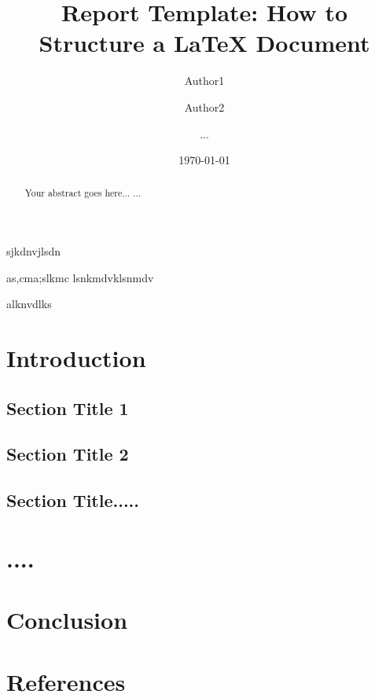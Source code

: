 \documentclass[11pt,a4paper]{report}
\begin{document}
\title{Report Template: How to Structure a LaTeX Document}
\author{Author1 \and Author2 \and ...}
\date{\today}
\maketitle

\begin{abstract}
Your abstract goes here...
...
\end{abstract}
sjkdnvjlsdn

as,cma;slkmc
lsnkmdvklsnmdv

alknvdlks
\chapter{Introduction}
\section{Section Title 1}
\section{Section Title 2}
\section{Section Title.....}

\chapter{....}

\chapter{Conclusion}


\chapter*{References}
\end{document}
